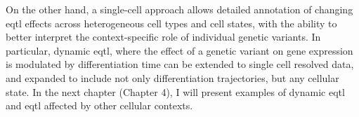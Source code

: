 On the other hand, a single-cell approach allows detailed annotation of changing \gls{eqtl} effects across heterogeneous cell types and cell states, with the ability to better interpret the context-specific role of individual genetic variants. 
In particular, dynamic \gls{eqtl}, where the effect of a genetic variant on gene expression is modulated by differentiation time \cite{francesconi2014effects, strober2019dynamic} can be extended to single cell resolved data, and expanded to include not only differentiation trajectories, but any cellular state.
In the next chapter (Chapter 
4), 
I will present examples of dynamic \gls{eqtl} and \gls{eqtl} affected by other cellular contexts.